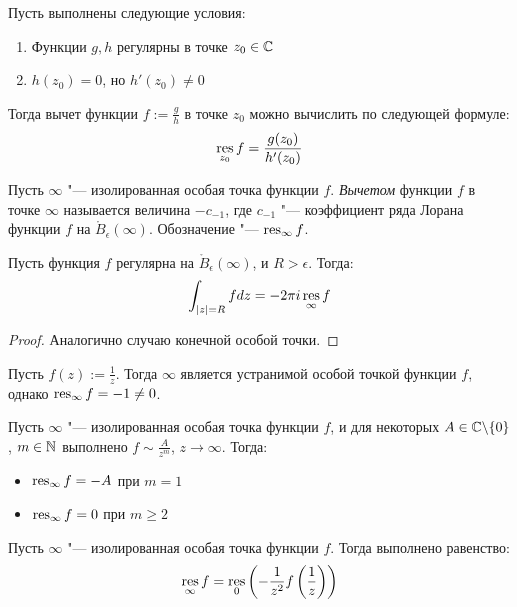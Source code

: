 \begin{proposition}
	Пусть выполнены следующие условия:
	\begin{enumerate}
		\item Функции $g, h$ регулярны в точке $z_0 \in \mathbb{C}$
		\item $h(z_0) = 0$, но $h'(z_0) \ne 0$
	\end{enumerate}

	Тогда вычет функции $f := \frac{g}{h}$ в точке $z_0$ можно вычислить по следующей формуле:
	\[\operatorname*{res}_{z_0}f = \frac{g(z_0)}{h'(z_0)}\]
\end{proposition}

\begin{definition}
	Пусть $\infty$ "--- изолированная особая точка функции $f$. \textit{Вычетом} функции $f$ в точке $\infty$ называется величина $-c_{-1}$, где $c_{-1}$ "--- коэффициент ряда Лорана функции $f$ на $\mathring B_\epsilon(\infty)$. Обозначение "--- $\operatorname*{res}_{\infty}f$.
\end{definition}

\begin{proposition}
	Пусть функция $f$ регулярна на $\mathring B_\epsilon(\infty)$, и $R > \epsilon$. Тогда:
	\[\int_{|z| = R}fdz = -2\pi i\operatorname*{res}_\infty f\]
\end{proposition}

\begin{proof}
	Аналогично случаю конечной особой точки.
\end{proof}

\begin{example}
	Пусть $f(z) := \frac 1z$. Тогда $\infty$ является устранимой особой точкой функции $f$, однако $\operatorname*{res}_\infty{f} = -1 \ne 0$.
\end{example}

\begin{proposition}
	Пусть $\infty$ "--- изолированная особая точка функции $f$, и для некоторых $A \in \mathbb{C} \backslash \{0\}$, $m \in \mathbb{N}$ выполнено $f \sim \frac{A}{z^m}$, $z \to \infty$. Тогда:
	\begin{itemize}
		\item $\operatorname*{res}_\infty f = -A$ при $m = 1$
		\item $\operatorname*{res}_\infty f = 0$ при $m \ge 2$
	\end{itemize}
\end{proposition}

\begin{proposition}
	Пусть $\infty$ "--- изолированная особая точка функции $f$. Тогда выполнено равенство:
	\[\operatorname*{res}_\infty f = \operatorname*{res}_0\left(-\frac1{z^2}f\left(\frac1z\right)\right)\]
\end{proposition}

